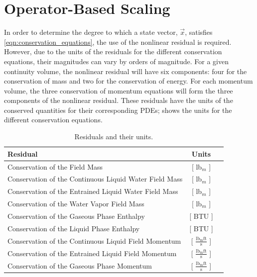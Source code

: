 \section{Operator-Based Scaling}
\label{sect:operator_scaling}
In order to determine the degree to which a state vector, $\vec{x}$, satisfies \eqref{eqn:conservation_equations}, the use of the nonlinear residual is required.
However, due to the units of the residuals for the different conservation equations, their magnitudes can vary by orders of magnitude. 
For a given continuity volume, the nonlinear residual will have six components: four for the conservation of mass and two for the conservation of energy.
For each momentum volume, the three conservation of momentum equations will form the three components of the nonlinear residual.
These residuals have the units of the conserved quantities for their corresponding PDEs;  shows the units for the different conservation equations.

\begin{table}[ht]
\centering
\begin{tabular}{@{}l c r @{}} \toprule
Residual & Units \\
\midrule
Conservation of the \NCG{} Field Mass                  & [ lb$_m$ ] \\
Conservation of the Continuous Liquid Water Field Mass & [ lb$_m$ ] \\
Conservation of the Entrained Liquid Water Field Mass  & [ lb$_m$ ] \\
Conservation of the Water Vapor Field Mass             & [ lb$_m$ ] \\
Conservation of the Gaseous Phase Enthalpy             & [ BTU ]    \\
Conservation of the Liquid Phase Enthalpy              & [ BTU ]    \\
Conservation of the Continuous Liquid Field Momentum   & [ $\frac{\text{lb}_{\text{m}} \text{ft}}{\text{s}}$ ] \\
Conservation of the Entrained Liquid Field Momentum & [ $\frac{\text{lb}_{\text{m}} \text{ft}}{\text{s}}$ ] \\
Conservation of the Gaseous Phase Momentum & [ $\frac{\text{lb}_{\text{m}} \text{ft}}{\text{s}}$ ] \\
\bottomrule  
\end{tabular}
\caption{Residuals and their units.}
\label{tab:scaling_units_scales}
\end{table}

